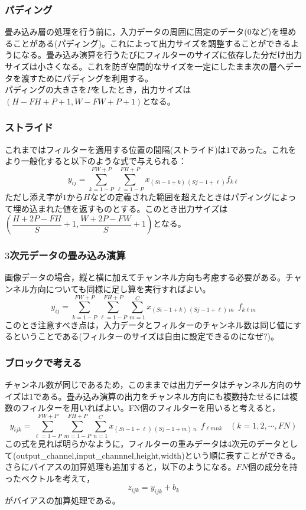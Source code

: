 \documentclass{jarticle}
\begin{document}
\subsubsection{パディング}
畳み込み層の処理を行う前に，入力データの周囲に固定のデータ($0$など)を埋めることがある(パディング)。これによって出力サイズを調整することができるようになる。畳み込み演算を行うたびにフィルターのサイズに依存した分だけ出力サイズは小さくなる。これを防ぎ空間的なサイズを一定にしたまま次の層へデータを渡すためにパディングを利用する。\\
パディングの大きさを$P$をしたとき，出力サイズは$(H-FH+P+1,W-FW+P+1)$となる。
\subsubsection{ストライド}
これまではフィルターを適用する位置の間隔(ストライド)は$1$であった。これをより一般化すると以下のような式で与えられる：
\[
y_{ij} = \sum_{k=1-P}^{FW+P} \sum_{\ell = 1-P}^{FH+P} x_{(Si-1+k)~(Sj-1+\ell)} f_{k\ell}
\]
ただし添え字が$1$から$H$などの定義された範囲を超えたときはパディングによって埋め込まれた値を返すものとする。このとき出力サイズは$(\dfrac{H+2P-FH}{S}+1,\dfrac{W+2P-FW}{S}+1)$となる。
\subsubsection{$3$次元データの畳み込み演算}
画像データの場合，縦と横に加えてチャンネル方向も考慮する必要がある。チャンネル方向についても同様に足し算を実行すればよい。
\[
y_{ij} = \sum_{k=1-P}^{FW+P} \sum_{\ell = 1-P}^{FH+P} \sum_{m = 1}^{C} x_{(Si-1+k)~(Sj-1+\ell)~m}~~ f_{k\ell m}
\]
このとき注意すべき点は，入力データとフィルターのチャンネル数は同じ値にするということである(フィルターのサイズは自由に設定できるのになぜ?)。
\subsubsection{ブロックで考える}
チャンネル数が同じであるため，このままでは出力データはチャンネル方向のサイズは$1$である。畳み込み演算の出力をチャンネル方向にも複数持たせるには複数のフィルターを用いればよい。FN個のフィルターを用いると考えると，
\[
y_{ijk} = \sum_{\ell=1-P}^{FW+P} \sum_{m = 1-P}^{FH+P} \sum_{n = 1}^{C} x_{(Si-1+\ell)~(Sj-1+m)~n}~~ f_{\ell m n k}~~~~(k=1,2,\cdots,FN)
\]
この式を見れば明らかなように，フィルターの重みデータは$4$次元のデータとして(output\_channel,input\_channnel,height,width)という順に表すことができる。\\
さらにバイアスの加算処理も追加すると，以下のようになる。$FN$個の成分を持ったベクトルを考えて，
\[
z_{ijk} = y_{ijk}+b_k
\]
がバイアスの加算処理である。
\end{document}
